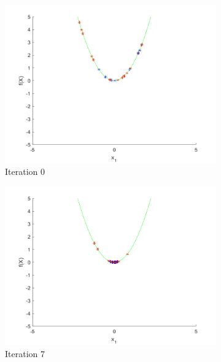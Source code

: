 \begin{figure}
  \centering
  \begin{subfigure}[b]{0.4\textwidth}
    \includegraphics[width=\textwidth]{img/smpl/circ/loa-iter-0}
    \caption{Iteration 0}
    \label{fig:s1-iter-0}
  \end{subfigure}
  \begin{subfigure}[b]{0.4\textwidth}
    \includegraphics[width=\textwidth]{img/smpl/circ/loa-iter-7}
    \caption{Iteration 7}
    \label{fig:s1-iter-1}
  \end{subfigure}
  \begin{subfigure}[b]{0.4\textwidth}

\end{subfigure}
\end{figure}
